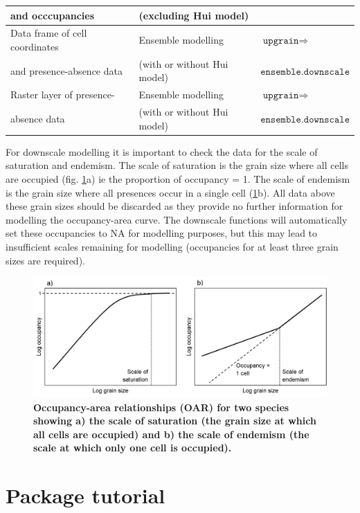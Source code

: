\documentclass{article}[12pt, a4paper]
\begin{document}
\begin{table}[th]
\begin{tabular}{| l | l | l |}
and occcupancies                &	(excluding Hui model)& \\ \hline	
Data frame of cell coordinates  & Ensemble modelling   & $\texttt{upgrain} \Rightarrow$ \\
and presence-absence data       &	(with or without Hui model)& $\texttt{ensemble.downscale}$ \\ \hline
Raster layer of presence-       & Ensemble modelling   & $\texttt{upgrain} \Rightarrow$ \\
absence data                    &	(with or without Hui model)& $\texttt{ensemble.downscale}$ \\ \hline
\end{tabular}
\end{table}

For downscale modelling it is important to check the data for the scale of saturation and endemism. The scale of saturation is the grain size where all cells are occupied (fig. \ref{fig:Saturation}a) ie the proportion of occupancy = 1. The scale of endemism is the grain size where all presences occur in a single cell (\ref{fig:Saturation}b). All data above these grain sizes should be discarded as they provide no further information for modelling the occupancy-area curve. The downscale functions will automatically set these occupancies to NA for modelling purposes, but this may lead to insufficient scales remaining for modelling (occupancies for at least three grain sizes are required).

\begin{figure}[!h]
\centering
\includegraphics[width=12.5cm]{Saturation.png}
\caption{\textbf{Occupancy-area relationships (OAR) for two species showing a) the scale of saturation (the grain size at which all cells are occupied) and b) the scale of endemism (the scale at which only one cell is occupied).}}
\label{fig:Saturation}
\end{figure}

\newpage
\section{Package tutorial}
\end{document}
